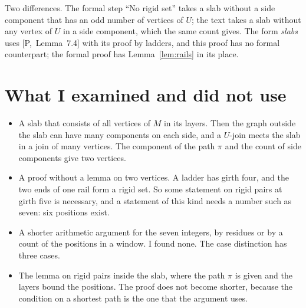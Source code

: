 \documentclass[11pt]{article}
\newcommand{\inP}[1]{[P,~#1]}
\begin{document}
Two differences. The formal step ``No rigid set'' takes a slab without a side component that has
an odd number of vertices of $U$; the text takes a slab without any vertex of $U$ in a side
component, which the same count gives. The form \emph{slabs} uses \inP{Lemma~7.4} with its proof
by ladders, and this proof has no formal counterpart; the formal proof has
Lemma~\ref{lem:rails} in its place.

\section{What I examined and did not use}

\begin{itemize}[leftmargin=1.2em]
\item A slab that consists of all vertices of $M$ in its layers. Then the graph outside the slab
can have many components on each side, and a $U$-join meets the slab in a join of many
vertices. The component of the path $\pi$ and the count of side components give two vertices.
\item A proof without a lemma on two vertices. A ladder has girth four, and the two ends of one
rail form a rigid set. So some statement on rigid pairs at girth five is necessary, and a
statement of this kind needs a number such as seven: six positions exist.
\item A shorter arithmetic argument for the seven integers, by residues or by a count of the
positions in a window. I found none. The case distinction has three cases.
\item The lemma on rigid pairs inside the slab, where the path $\pi$ is given and the layers
bound the positions. The proof does not become shorter, because the condition on a shortest
path is the one that the argument uses.
\end{itemize}
\end{document}
